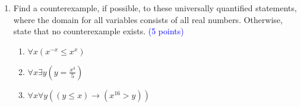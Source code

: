 \documentclass{article}
\newcommand{\pt}[1]{\textcolor{blue}{(#1 points)}}
\begin{document}
\begin{enumerate}
    
    \item{Find a counterexample, if possible, to these universally quantified statements, where the domain for all variables consists of all real numbers. Otherwise, state that no counterexample exists. \pt{5}}
    \begin{enumerate}
        \item $\forall x (x^{-x} \leq x^x)$\\
        \item $\forall x \exists y (y = \frac{x^3}{5})$ \\
        \item $\forall x \forall y  ((y \leq x) \to (x^{16} > y))$
    \end{enumerate}
\end{enumerate}
\end{document}
